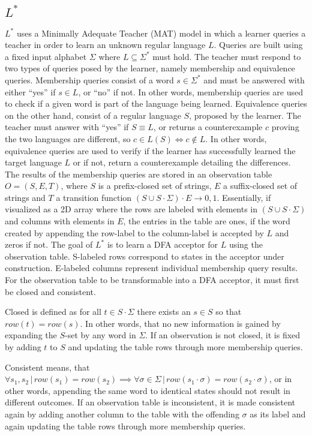 \subsection{$L^*$}
$L^*$ uses a Minimally Adequate Teacher (MAT) model in which a learner queries a teacher in order to learn an unknown regular language $L$. Queries are built using a fixed input alphabet $\Sigma$ where $L \subseteq \Sigma^*$ must hold. The teacher must respond to two types of queries posed by the learner, namely membership and equivalence queries. Membership queries consist of a word $s \in \Sigma^*$ and must be answered with either ``yes'' if $s \in L$, or ``no'' if not. In other words, membership queries are used to check if a given word is part of the language being learned. Equivalence queries on the other hand, consist of a regular language $S$, proposed by the learner. The teacher must answer with  ``yes'' if $S \equiv L$, or returns a counterexample $c$ proving the two languages are different, so $c \in L(S) \iff c \notin L$. In other words, equivalence queries are used to verify if the learner has successfully learned the target language $L$ or if not, return a counterexample detailing the differences. The results of the membership queries are stored in an observation table $O = (S,E,T)$, where $S$ is a prefix-closed set of strings, $E$ a suffix-closed set of strings and $T$ a transition function $(S \cup S \cdot \Sigma) \cdot E \rightarrow {0,1}$. Essentially, if visualized as a 2D array where the rows are labeled with elements in $(S \cup S \cdot \Sigma)$ and columns with elements in $E$, the entries in the table are ones, if the word created by appending the row-label to the column-label is accepted by $L$ and zeros if not. The goal of $L^*$ is to learn a DFA acceptor for $L$ using the observation table. S-labeled rows correspond to states in the acceptor under construction. E-labeled columns represent individual membership query results. For the observation table to be transformable into a DFA acceptor, it must first be closed and consistent. 

Closed is defined as for all $t \in S \cdot \Sigma$ there exists an $s \in S$ so that $row(t) = row(s)$. In other words, that no new information is gained by expanding the $S$-set by any word in $\Sigma$. If an observation is not closed, it is fixed by adding $t$ to $S$ and updating the table rows through more membership queries. 

Consistent means, that $\forall s_1, s_2 \,|\, row(s_1) = row(s_2) \implies \forall \sigma \in \Sigma \,|\, row(s_1 \cdot \sigma) = row(s_2 \cdot \sigma)$, or in other words, appending the same word to identical states should not result in different outcomes. If an observation table is inconsistent, it is made consistent again by adding another column to the table with the offending $\sigma$ as its label and again updating the table rows through more membership queries. 

